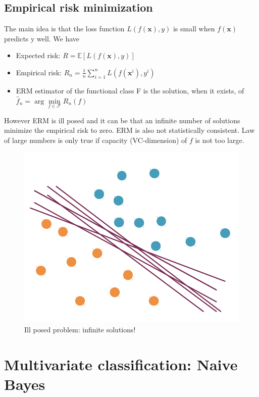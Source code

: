\documentclass[a4paper,12pt]{article}
\newcommand{\xx}{{\bm x}}
\begin{document}
\subsection{Empirical risk minimization}
The main idea is that the loss function $L(f(\xx),y)$ is small when $f(\xx)$ predicts y well. We have
\begin{itemize}
\item Expected risk: $R = \mathbb{E} [ L(f(\xx),y) ]$
\item Empirical risk: $R_n = \frac{1}{n} \sum_{i=1}^{n} L(f(\xx^i),y^i)$
\item ERM estimator of the functional class F is the solution, when it exists, of
$\hat{f}_n = \arg \min\limits_{f \in \mathcal{F}} R_n(f)$
\end{itemize}
However ERM is ill posed and it can be that an infinite number of solutions minimize the empirical risk to zero. ERM is also not statistically consistent. Law of large numbers is only true if capacity (VC-dimension) of $f$ is not too large.
\begin{figure}[h]
\centering
\includegraphics[scale=0.3]{erminfinite}
\caption{Ill posed problem: infinite solutions!}
    \label{fig:creditscoring}
\end{figure}
\section{Multivariate classification: Naive Bayes}
\end{document}
